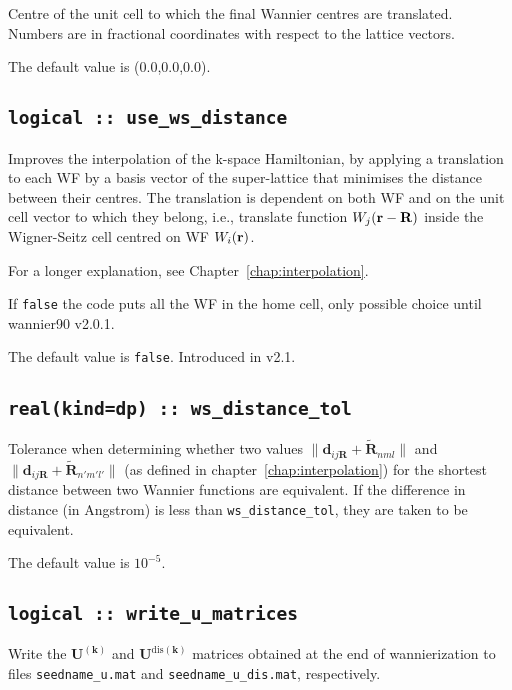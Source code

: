 Centre of the unit cell to which the final Wannier centres are
translated. Numbers are in fractional coordinates with respect to the
lattice vectors.

The default value is (0.0,0.0,0.0).

\subsection[use\_ws\_distance]{\tt logical :: use\_ws\_distance}

Improves the interpolation of the k-space Hamiltonian, by
applying a translation to each WF by a basis
vector of the super-lattice that minimises the distance between their centres.
The translation is dependent on both WF and on the unit cell vector
to which they belong, i.e., translate function $W_j({\bf r}-{\bf R})$ inside
the Wigner-Seitz cell centred on WF $W_i({\bf r})$.

For a longer explanation, see Chapter~\ref{chap:interpolation}.

If {\tt false} the code puts all the WF in the home cell, only possible choice until wannier90 v2.0.1.

The default value is {\tt false}. Introduced in v2.1.

\subsection[ws\_distance\_tol]{\tt real(kind=dp) :: ws\_distance\_tol}

Tolerance when determining whether two values $\|\mathbf{d}_{ij\mathbf{R}} + \tilde{\mathbf{R}}_{nml} \|$ and $\|\mathbf{d}_{ij\mathbf{R}} + \tilde{\mathbf{R}}_{n'm'l'} \|$ (as defined in chapter~\ref{chap:interpolation}) for the shortest distance between two Wannier functions are equivalent. If the difference in distance (in Angstrom) is less than \texttt{ws\_distance\_tol}, they are taken to be equivalent.

The default value is $10^{-5}$.

\subsection[write\_u\_matrices]{\tt logical :: write\_u\_matrices}

Write the $\mathbf{U}^{(\mathbf{k})}$ and $\mathbf{U}^{\mathrm{dis}(\mathbf{k})}$ matrices obtained at the end of wannierization to files
{\tt seedname\_u.mat} and {\tt seedname\_u\_dis.mat}, respectively.

